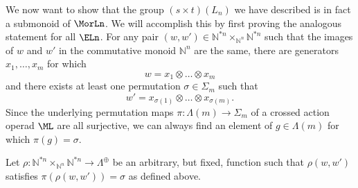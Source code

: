 We now want to show that the group $(s \times t)(L_n)$ we have described is in fact a submonoid of $\MorLn$. We will accomplish this  by first proving the analogous statement for all $\ELn$. For any pair $(w, w') \in \mathbb{N}^{\ast n} \times_{\mathbb{N}^n} \mathbb{N}^{\ast n}$ such that the images of $w$ and $w'$ in the commutative monoid $\mathbb{N}^n$ are the same, there are generators $x_1, \ldots, x_m$ for which 
  \[
    w = x_1 \otimes \ldots \otimes x_m
  \]
and there exists at least one permutation $\sigma \in \Sigma_m$ such that
  \[
    w' = x_{\sigma(1)} \otimes \ldots \otimes x_{\sigma(m)}.
  \]
Since the underlying permutation maps $\pi \colon \Lambda(m) \rightarrow \Sigma_m$ of a crossed action operad $\ML$ are all surjective, we can always find an element of $g \in \Lambda(m)$ for which $\pi(g) = \sigma$. 

\begin{nota}\label{rho_ww'}
Let $\rho \colon \mathbb{N}^{\ast n} \times_{\mathbb{N}^n} \mathbb{N}^{\ast n} \rightarrow \Lambda^{\oplus}$ be an arbitrary, but fixed, function such that $\rho(w,w')$ satisfies $\pi(\rho(w,w')) = \sigma$ as defined above.
\end{nota}

